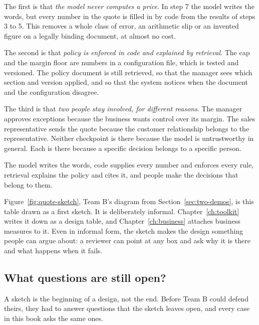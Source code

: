 The first is that \emph{the model never computes a price}. In step 7 the model writes the words, but every number in the quote is filled in by code from the results of steps 3 to 5. This removes a whole class of error, an arithmetic slip or an invented figure on a legally binding document, at almost no cost.

The second is that \emph{policy is enforced in code and explained by retrieval}. The cap and the margin floor are numbers in a configuration file, which is tested and versioned. The policy document is still retrieved, so that the manager sees which section and version applied, and so that the system notices when the document and the configuration disagree.

The third is that \emph{two people stay involved, for different reasons}. The manager approves exceptions because the business wants control over its margin. The sales representative sends the quote because the customer relationship belongs to the representative. Neither checkpoint is there because the model is untrustworthy in general. Each is there because a specific decision belongs to a specific person.

\begin{keyidea}
The model writes the words, code supplies every number and enforces every rule, retrieval explains the policy and cites it, and people make the decisions that belong to them.
\end{keyidea}

Figure~\ref{fig:quote-sketch}, Team B's diagram from Section~\ref{sec:two-demos}, is this table drawn as a first sketch. It is deliberately informal. Chapter~\ref{ch:toolkit} writes it down as a design table, and Chapter~\ref{ch:business} attaches business measures to it. Even in informal form, the sketch makes the design something people can argue about: a reviewer can point at any box and ask why it is there and what happens when it fails.

\subsection{What questions are still open?}

A sketch is the beginning of a design, not the end. Before Team B could defend theirs, they had to answer questions that the sketch leaves open, and every case in this book asks the same ones.

